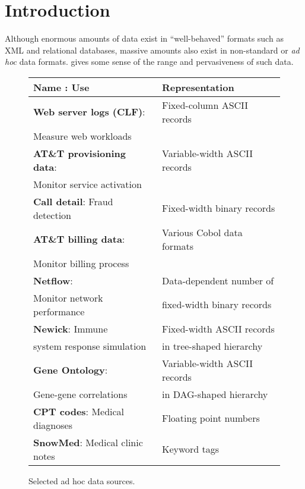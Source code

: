 \section{Introduction}
\label{section:intro}
Although enormous amounts of data exist in ``well-behaved'' formats such
as XML and relational databases, massive amounts also exist in
non-standard or \textit{ad hoc} data formats. 
gives some sense of the range and pervasiveness of such data.
\begin{figure}
\begin{center}
\begin{tabular}{l|l}
\hline
Name : Use   &  Representation               \\ \hline
\textbf{Web server logs (CLF)}:  &  Fixed-column ASCII records \\ 
Measure web workloads &                             \\ \hline
\textbf{AT\&T provisioning data}: & Variable-width ASCII records  \\ 
Monitor service activation &                              \\ \hline
\textbf{Call detail}: Fraud detection  &  Fixed-width binary records \\  \hline 
\textbf{AT\&T billing data}: & Various Cobol data formats  \\ 
Monitor billing process   &                             \\ \hline
\textbf{Netflow}:                        & Data-dependent number of     \\ 
Monitor network performance  & fixed-width binary records  \\ \hline
\textbf{Newick}:   Immune                 & Fixed-width ASCII records \\ 
system response simulation & in tree-shaped hierarchy\\ \hline                                
\textbf{Gene Ontology}:             & Variable-width ASCII records \\
Gene-gene correlations     & in DAG-shaped hierarchy \\ \hline
\textbf{CPT codes}: Medical diagnoses & Floating point numbers \\ \hline
\textbf{SnowMed}: Medical clinic notes & Keyword tags  \\ 
\end{tabular}

\caption{Selected ad hoc data sources.}
\label{figure:data-sources}
\end{center}
\end{figure}
